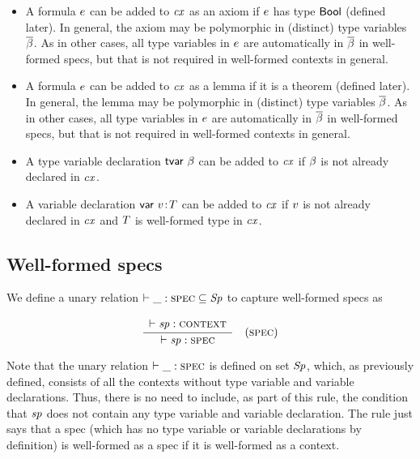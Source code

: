 \begin{itemize}
\item
A formula $e$ can be added to $\mathit{cx}$ as an axiom if $e$ has type
$\mathsf{Bool}$ (defined later). In general, the axiom may be polymorphic in
(distinct) type variables $\overline{\beta}$. As in other cases, all type variables in
$e$ are automatically in $\overline{\beta}$ in well-formed specs, but that is not
required in well-formed contexts in general.
\item
A formula $e$ can be added to $\mathit{cx}$ as a lemma if it is a theorem (defined
later). In general, the lemma may be polymorphic in (distinct) type variables
$\overline{\beta}$. As in other cases, all type variables in $e$ are automatically
in $\overline{\beta}$ in well-formed specs, but that is not required in well-formed
contexts in general.
\item
A type variable declaration $\mathsf{tvar}\ \beta$ can be added to $\mathit{cx}$ if $\beta$ is not
already declared in $\mathit{cx}$.
\item
A variable declaration $\mathsf{var}\ v\!:\!T$ can be added to $\mathit{cx}$ if $v$ is not already
declared in $\mathit{cx}$ and $T$ is well-formed type in $\mathit{cx}$.
\end{itemize}

\subsection{Well-formed specs}

We define a unary relation $\vdash\_:\textsc{spec}\subseteq\mathit{Sp}$ to capture well-formed
specs as

\[
\frac{\begin{array}{c}\vdash\mathit{sp}:\textsc{context}\end{array}}{\vdash\mathit{sp}:\textsc{spec}}\quad\mbox{(\textsc{spec})}
\]

Note that the unary relation $\vdash\_:\textsc{spec}$ is defined on set $\mathit{Sp}$, which, as
previously defined, consists of all the contexts without type variable and
variable declarations. Thus, there is no need to include, as part of this
rule, the condition that $\mathit{sp}$ does not contain any type variable and
variable declaration. The rule just says that a spec (which has no type
variable or variable declarations by definition) is well-formed as a spec if
it is well-formed as a context.

